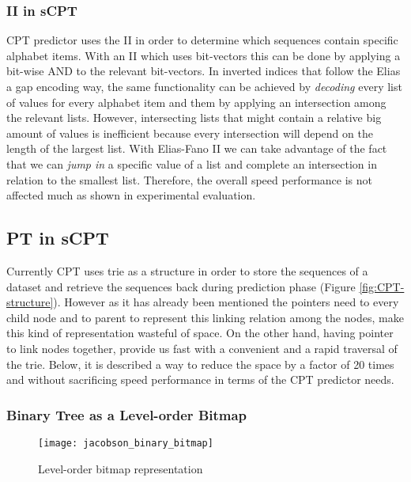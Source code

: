 \subsubsection*{II in sCPT}
CPT predictor uses the II in order to determine which sequences contain specific alphabet items. With an II which uses bit-vectors this can be done by applying a bit-wise AND to the relevant bit-vectors. In inverted indices that follow the Elias a gap encoding way, the same functionality can be achieved by \emph{decoding} every list of values for every alphabet item and them by applying an intersection among the relevant lists. However, intersecting lists that might contain a relative big amount of values is inefficient because every intersection will depend on the length of the largest list. With Elias-Fano II we can take advantage of the fact that we can \emph{jump in} a specific value of a list and complete an intersection in relation to the smallest list. Therefore, the overall speed performance is not affected much as shown in experimental evaluation.

\subsection{PT in sCPT}
Currently CPT uses trie as a structure in order to store the sequences of a dataset and retrieve the sequences back during prediction phase (Figure \ref{fig:CPT-structure}). However as it has already been mentioned the pointers need to every child node and to parent to represent this linking relation among the nodes, make this kind of representation wasteful of space. On the other hand, having pointer to link nodes together, provide us fast with a convenient and a rapid traversal of the trie. Below, it is described a way to reduce the space by a factor of 20 times and without sacrificing speed performance in terms of the CPT predictor needs.
\subsubsection*{Binary Tree as a Level-order Bitmap}

\begin{figure}
	 \centering
    \texttt{[image: jacobson\_binary\_bitmap]}
    \caption{Level-order bitmap representation}
    \label{fig:binary_bm}
\end{figure}

